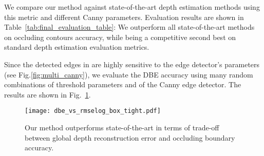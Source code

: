 \documentclass[10pt,twocolumn,letterpaper]{article}
\begin{document}
We compare our method against state-of-the-art depth estimation methods using 
this metric and different Canny parameters. Evaluation results are shown in 
Table~\ref{tab:final_evaluation_table}: We outperform all state-of-the-art 
methods on occluding contours accuracy, while being a 
competitive second best on standard depth estimation evaluation 
metrics.

Since the detected edges in  are highly 
sensitive to the edge detector's parameters (see Fig.\ref{fig:multi_canny}), 
we evaluate the DBE accuracy  using many 
random combinations of threshold parameters  and  of the
Canny edge detector. The results are shown in Fig.~\ref{fig:compare_trade_off}.

\begin{figure}[t]	
	\begin{center}		
		\texttt{[image: dbe\_vs\_rmselog\_box\_tight.pdf]}
	\end{center}
	\caption{
	Our method outperforms state-of-the-art in terms of trade-off between 
	global depth reconstruction error and occluding boundary accuracy.
	} 
	\label{fig:compare_trade_off}
\end{figure}
\end{document}
